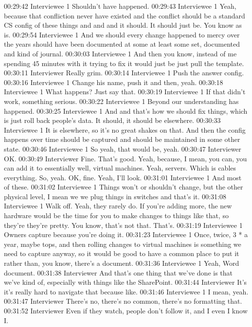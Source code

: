 00:29:42 Interviewee 1
Shouldn't have happened.
00:29:43 Interviewee 1
Yeah, because that confliction never have existed and the conflict should be a standard CS config of these things and and and it should. It should just be. You know as is.
00:29:54 Interviewee 1
And we should every change happened to mercy over the years should have been documented at some at least some set, documented and kind of journal.
00:30:03 Interviewee 1
And then you know, instead of me spending 45 minutes with it trying to fix it would just be just pull the template.
00:30:11 Interviewer
Really grim.
00:30:14 Interviewee 1
Push the answer config.
00:30:16 Interviewee 1
Change his name, push it and then, yeah.
00:30:18 Interviewee 1
What happens? Just say that.
00:30:19 Interviewee 1
If that didn't work, something serious.
00:30:22 Interviewee 1
Beyond our understanding has happened.
00:30:25 Interviewee 1
And and that's how we should fix things, which is just roll back people's data. It should, it should be elsewhere.
00:30:33 Interviewee 1
It is elsewhere, so it's no great shakes on that. And then the config happens over time should be captured and should be maintained in some other state.
00:30:46 Interviewee 1
So yeah, that would be, yeah.
00:30:47 Interviewer
OK.
00:30:49 Interviewer
Fine. That's good. Yeah, because, I mean, you can, you can add it to essentially well, virtual machines. Yeah, servers. Which is cables everything. So, yeah. OK, fine. Yeah, I'll look.
00:31:01 Interviewee 1
And most of these.
00:31:02 Interviewee 1
Things won't or shouldn't change, but the other physical level, I mean we we plug things in switches and that's it.
00:31:08 Interviewee 1
Walk off. Yeah, they rarely do. If you're adding more, the new hardware would be the time for you to make changes to things like that, so they're they're pretty. You know, that's not that. That's.
00:31:19 Interviewee 1
Owners capture because you're doing it.
00:31:23 Interviewee 1
Once, twice, 3 * a year, maybe tops, and then rolling changes to virtual machines is something we need to capture anyway, so it would be good to have a common place to put it rather than, you know, there's a document.
00:31:36 Interviewee 1
Yeah, Word document.
00:31:38 Interviewer
And that's one thing that we've done is that we've kind of, especially with things like the SharePoint.
00:31:44 Interviewer
It's it's really hard to navigate that because like.
00:31:46 Interviewee 1
I mean, yeah.
00:31:47 Interviewer
There's no, there's no common, there's no formatting that.
00:31:52 Interviewer
Even if they watch, people don't follow it, and I even I know I.
